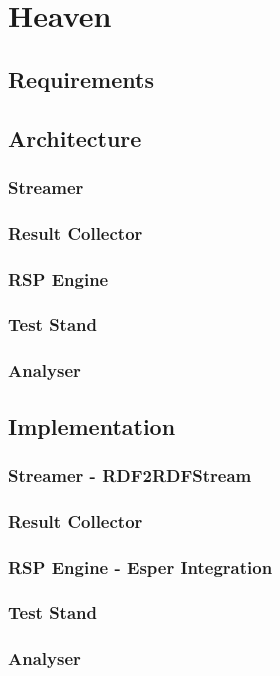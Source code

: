 \chapter{Heaven}

\section{Requirements}


\section{Architecture}
\subsection{Streamer}
\subsection{Result Collector}
\subsection{RSP Engine}
\subsection{Test Stand}
\subsection{Analyser}
\section{Implementation}
\subsection{Streamer - RDF2RDFStream}
\subsection{Result Collector}
\subsection{RSP Engine - Esper Integration}
\subsection{Test Stand}
\subsection{Analyser}

